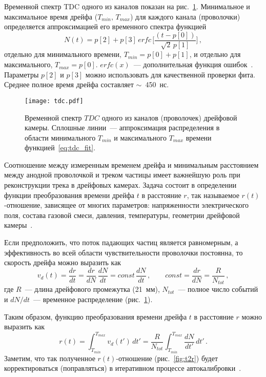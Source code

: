 Временной спектр TDC одного из каналов показан на рис.~\ref{fig:tdc}.
Минимальное и максимальное время дрейфа ($T_{min},\,T_{max}$) для каждого канала
(проволочки) определяется аппроксимацией его временного спектра функцией
\begin{equation}
  \label{eq:tdc_fit}
  N(t) = p[2] + p[3]\,erfc\,\Biggl[\frac{(t - p[0])}{\sqrt{2}\,p[1]} \Biggr]\,,
\end{equation}
отдельно для минимального времени, $T_{min} = p[0] + p[1]$, и отдельно для
максимального, $T_{max} = p[0]$. $erfc(x)$~--- дополнительная функция
ошибок~\cite{erfc_web}. Параметры $p[2]$ и $p[3]$ можно использовать для
качественной проверки фита. Среднее полное время дрейфа составляет
$\sim$~450~нс.

\begin{figure}[h]
  \centering
  \texttt{[image: tdc.pdf]}
  \caption{Временной спектр $TDC$ одного из каналов (проволочек) дрейфовой
    камеры. Сплошные линии~--- аппроксимация распределения в области
    минимального $T_{min}$ и максимального $T_{max}$ времени
    функцией~\eqref{eq:tdc_fit}.}
  \label{fig:tdc}
\end{figure}

Соотношение между измеренным временем дрейфа и минимальным расстоянием между
анодной проволочкой и треком частицы имеет важнейшую роль при реконструкции
трека в дрейфовых камерах. Задача состоит в определении функции преобразования
времени дрейфа $t$ в расстояние $r$, так называемое $r(t)$-отношение, зависящее
от многих параметров: напряженности электрического поля, состава газовой смеси,
давления, температуры, геометрии дрейфовой камеры~\cite{pesehonov86}.

Если предположить, что поток падающих частиц является равномерным, а
эффективность во всей области чувствительности проволочки постоянна, то скорость
дрейфа можно выразить как
\begin{equation}
  v_{d}(t) = \frac{dr}{dt} = \frac{dr}{dN}\,\frac{dN}{dt} =
  const\,\frac{dN}{dt}\,, \qquad
  const = \frac{dr}{dN} = \frac{R}{N_{tot}}\,,
\end{equation}
где $R$~--- длина дрейфового промежутка (21~мм), $N_{tot}$~--- полное число
событий и $dN/dt$~--- временное распределение (рис.~\ref{fig:tdc}).

Таким образом, функцию преобразования времени дрейфа $t$ в расстояние $r$ можно
выразить как
\begin{equation}
  r(t) = \int_{T_{min}}^{T_{max}} v_{d}(t')\,dt' = \frac{R}{N_{tot}}
  \int_{T_{min}}^{T_{max}} \frac{dN}{dt'}\,dt'\,.
\end{equation}
Заметим, что так полученное $r(t)$-отношение (рис.~\ref{fig:t2r}) будет
корректироваться (поправляться) в итеративном процессе
автокалибровки~\cite{gla_mucha10}.

